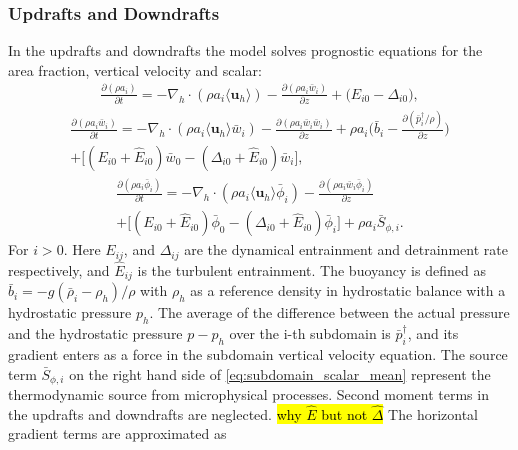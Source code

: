 \documentclass{report}
\begin{document}
\subsubsection{Updrafts and Downdrafts}
In the updrafts and downdrafts the model solves prognostic equations for the area fraction, vertical velocity and scalar:
\begin{eqnarray}
\frac{\partial (\rho a_i)}{\partial t} =
- \nabla_h \cdot (\rho a_i \langle \mathbf{u}_h \rangle) - 
\frac{\partial (\rho a_i \bar{w}_i)}{\partial z} +
{\Big(E_{i0} - \Delta_{i0} \Big)},
\label{eq:subdomain_area}
\end{eqnarray}
\begin{multline}
\label{eq:subdomain_w} 
\frac{\partial (\rho a_i \bar{w}_i)}{\partial t} =
- \nabla_h \cdot (\rho a_i \langle \mathbf{u}_h \rangle \bar{w}_i) - \frac{\partial (\rho a_i \bar{w}_i \bar{w}_i) }{\partial z} 
+ \rho a_i \Big( \bar{b}_i - 
\frac{\partial (\bar{p}_i^{\dagger}/\rho)}{\partial z}\Big) \\
+  \Big[ (E_{i0} + \hat{E}_{i0}) \bar{w}_0 - (\Delta_{i0} + \hat{E}_{i0}) \bar{w}_i \Big],
\end{multline}
\begin{multline}
 \label{eq:subdomain_scalar_mean} 
\frac{\partial (\rho a_i \bar{\phi}_i)}{\partial t} =
- \nabla_h \cdot (\rho a_i \langle \mathbf{u}_h \rangle \bar{\phi}_i) - \frac{\partial (\rho a_i \bar{w}_i \bar{\phi}_i)}{\partial z} \\
+ {\Big[(E_{i0} + \hat{E}_{i0}) \bar{\phi}_0  - (\Delta_{i0} + \hat{E}_{i0}) \bar{\phi}_i \Big]} 
+ \rho a_i \bar{S}_{\phi,i}.
\end{multline}
For $i > 0$. 
%
Here $E_{ij}$, and $\Delta_{ij}$ are the dynamical entrainment and detrainment rate respectively, and $\hat{E}_{ij}$ is the turbulent entrainment. The buoyancy is defined as $\bar{b}_i = -g(\bar{\rho}_i-\rho_h)/\rho$ with $\rho_h$ as a reference density in hydrostatic balance with a hydrostatic pressure $p_h$. The average of the difference between the actual pressure and the hydrostatic pressure  $p - p_h$ over the i-th subdomain is $\bar{p}_i^{\dagger}$, and its gradient enters as a force in the subdomain vertical velocity equation. The source term $\bar{S}_{\phi,i}$ on the right hand side of \eqref{eq:subdomain_scalar_mean} represent the thermodynamic source from microphysical processes. Second moment terms in the updrafts and downdrafts are neglected.
\hl{why $\hat{E}$ but not $\hat{\Delta}$}
The horizontal gradient terms are approximated as 
\end{document}
